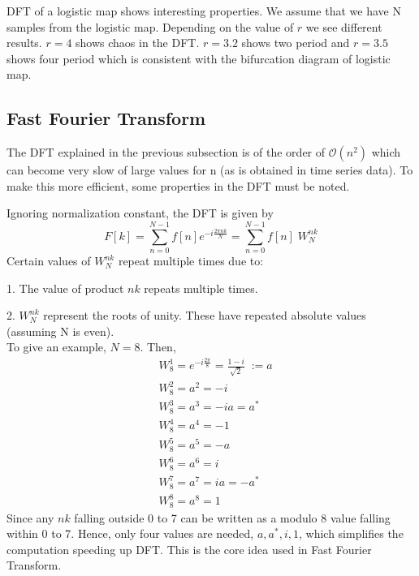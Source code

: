 \documentclass[11pt]{article}
\begin{document}
            DFT of a logistic map shows interesting properties. We assume that we have N samples from the logistic map. Depending on the value of $r$ we see different results. $r=4$ shows chaos in the DFT. $r=3.2$ shows two period and $r=3.5$ shows four period which is consistent with the bifurcation diagram of logistic map. 

            \subsection{Fast Fourier Transform}
            The DFT explained in the previous subsection is of the order of $\mathcal{O}(n^2)$ which can become very slow of large values for n (as is obtained in time series data). To make this more efficient, some properties in the DFT must be noted.

            Ignoring normalization constant, the DFT is given by 
            $$
               F[k] = \sum_{n=0}^{N-1} f[n] e^{-i\frac{ 2\pi n k }{N}} = \sum_{n=0}^{N-1} f[n] \; W_N^{nk}
            $$
            Certain values of $W_N^{nk}$ repeat multiple times due to:

            1. The value of product $nk$ repeats multiple times.

            2. $W_N^{nk}$ represent the roots of unity. These have repeated absolute values (assuming N is even). \\[5mm]
            To give an example, $N=8$. Then,
            \begin{align*}
              & W_8^1 = e^{-i\frac{2\pi}{8}} = \frac{1 - i}{\sqrt{2}} \; := a \\
               &W_8^2 = a^2 = -i \\
               &W_8^3 = a^3 = -i a = a^* \\
               &W_8^4 = a^4 = -1 \\
               &W_8^5 = a^5 = -a \\
               &W_8^6 = a^6 = i \\
               &W_8^7 = a^7 = i a = -a^* \\
               &W_8^8 = a^8 = 1
            \end{align*}
            Since any $nk$ falling outside 0 to 7 can be written as a modulo 8 value falling within 0 to 7. Hence, only four values are needed, $a, a^*, i, 1$, which simplifies the computation speeding up DFT. This is the core idea used in Fast Fourier Transform. 
            
\end{document}
